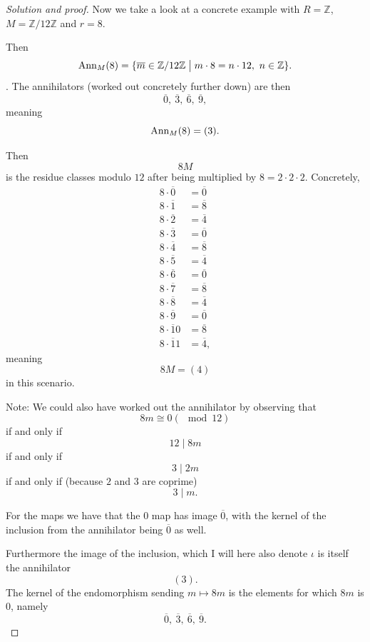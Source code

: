 \documentclass[11pt]{article}
\begin{document}
\begin{proof}[Solution and proof]
    Now we take a look at a concrete 
    example with $R = \mathbb Z$, $M = \mathbb Z/12\mathbb Z$ 
    and $r = 8$. 

    Then 
    \[
        \operatorname{Ann}_M(8) = \{\overline m \in \mathbb Z/12\mathbb Z 
        \bigm| m \cdot 8 = n \cdot 12, \ n \in 
        \mathbb Z\}. 
    \]. 
    The annihilators (worked out concretely 
    further down) are then  
    \[
        \overline 0, \ \overline 3, \ \overline 6, \ \overline 9,
    \]
    meaning 
    \[
        \operatorname{Ann}_M(8) = (3). 
    \]

    Then 
    \[
        8M
    \] 
    is the residue classes modulo $12$ 
    after being multiplied by $8 = 2\cdot 2 \cdot 2$.
    Concretely, 
    \begin{align*}
        8 \cdot \overline 0  &= \overline 0 \\ 
        8 \cdot \overline 1  &= \overline 8 \\ 
        8 \cdot \overline 2  &= \overline 4 \\ 
        8 \cdot \overline 3  &= \overline 0 \\ 
        8 \cdot \overline 4  &= \overline 8 \\ 
        8 \cdot \overline 5  &= \overline 4 \\ 
        8 \cdot \overline 6  &= \overline 0 \\ 
        8 \cdot \overline 7  &= \overline 8 \\ 
        8 \cdot \overline 8  &= \overline 4 \\ 
        8 \cdot \overline 9  &= \overline 0 \\ 
        8 \cdot \overline 10 &= \overline 8 \\ 
        8 \cdot \overline 11 &= \overline 4, 
    \end{align*} 
    meaning 
    \[
        8M = (4)
    \]
    in this scenario.

    Note: 
    We could also have worked out 
    the annihilator by observing that 
    \[
        8m \cong 0 (\mod 12) 
    \]
    if and only if 
    \[
        12 \mid 8m 
    \]
    if and only if 
    \[
        3 \mid 2m 
    \]
    if and only if (because $2$ and $3$ are coprime) 
    \[
        3 \mid m. 
    \]

    For the maps we have that the 
    $0$ map has image $\overline 0$, 
    with the kernel of the inclusion from 
    the annihilator being $\overline 0$ as well. 

    Furthermore the image of the inclusion, which 
    I will here also denote $\iota$ is itself 
    the annihilator 
    \[
        (3). 
    \] 
    The kernel of the endomorphism sending 
    $m \mapsto 8m$ is the 
    elements for which $8m$ is $0$, namely 
    \[
        \overline 0, \ \overline 3, \ \overline 6, \ \overline 9.  
    \]


\end{proof}
\end{document}
